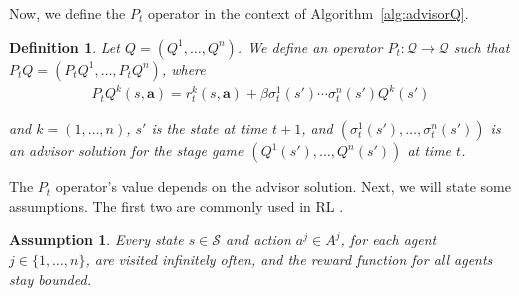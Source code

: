 \documentclass[jair, twoside,11pt,theapa]{article}
\newtheorem{defn}{Definition}
\newtheorem{assumption}{Assumption}
\begin{document}
Now, we define the $P_t$ operator in the context of Algorithm~\ref{alg:advisorQ}.


\begin{defn}\label{defn:Pt}
Let $Q = (Q^1, \ldots, Q^n)$. We define an operator $P_t: \mathcal{Q} \xrightarrow{} \mathcal{Q}$ such that $P_t Q = (P_t Q^1, \ldots, P_t Q^n)$, where 
\begin{equation}\label{eq:Ptdefn}
    \begin{array}{l}
         P_t Q^k(s, \boldsymbol{a}) =  r^k_t(s, \boldsymbol{a}) + 
         \beta \sigma_t^1(s') \cdots \sigma_t^n(s') Q^k(s')
    \end{array}
\end{equation}


\noindent and $k = (1, \ldots, n)$, $s'$ is the state at time $t+1$, and $(\sigma_t^1(s'), \ldots, \sigma_t^n(s'))$ is an advisor solution for the stage game $(Q^1(s'), \ldots, Q^n(s'))$ at time $t$. 
\end{defn}


The $P_t$ operator's value depends on the advisor solution. 
Next, we will state some assumptions. The first two are commonly used in RL  \citep{jaakkola1994convergence, singh2000convergence}.


\begin{assumption}\label{assumption:visitassumption}
    Every state $s\in \mathcal{S}$ and action $a^j \in A^j$, for each agent $j \in \{1, \ldots, n\}$, 
    are visited infinitely often, and the reward function for all agents stay bounded. 
\end{assumption}

\end{document}
